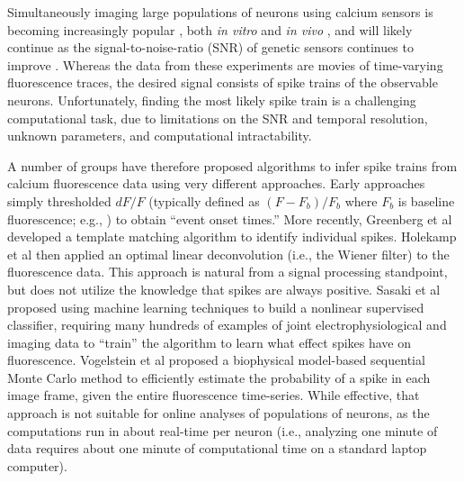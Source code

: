 
Simultaneously imaging large populations of neurons using calcium sensors is becoming increasingly popular \cite{ImagingManual}, both \emph{in vitro} \cite{SmettersYuste99, IkegayaYuste04} and \emph{in vivo} \cite{NagayamaChen07, GobelHelmchen07, LuoSvoboda08}, and will likely continue as the signal-to-noise-ratio (SNR) of genetic sensors continues to improve \cite{GaraschukKonnerth07, MankGriesbeck08b, WallaceHasan08}.  Whereas the data from these experiments are movies of time-varying fluorescence traces, the desired signal consists of spike trains of the observable neurons. Unfortunately, finding the most likely spike train is a challenging computational task, due to limitations on the SNR and temporal resolution, unknown parameters, and computational intractability. %

A number of groups have therefore proposed algorithms to infer spike trains from calcium fluorescence data using very different approaches.  Early approaches simply thresholded $dF/F$ (typically defined as $(F-F_b)/F_b$ where $F_b$ is baseline fluorescence; e.g., \cite{Schwartz98,Mao01}) to obtain ``event onset times.''  More recently, Greenberg et al \cite{GreenbergKerr08} developed a  template matching algorithm to identify individual spikes. %
Holekamp et al \cite{HolekampHoly08} then applied an optimal linear deconvolution (i.e., the Wiener filter) to the fluorescence data.  This approach is natural from a signal processing standpoint, but does not utilize the knowledge that spikes are always positive.  Sasaki et al \cite{SasakiIkegaya08} proposed using machine learning techniques to build a nonlinear supervised classifier, requiring many hundreds of examples of joint electrophysiological and imaging data to ``train'' the algorithm to learn what effect spikes have on fluorescence.  Vogelstein et al \cite{VogelsteinPaninski09} proposed a biophysical model-based sequential Monte Carlo method to efficiently estimate the probability of a spike in each image frame, given the entire fluorescence time-series.  While effective, that approach is not suitable for online analyses of populations of neurons, as the computations run in about real-time per neuron (i.e., analyzing one minute of data requires about one minute of computational time on a standard laptop computer).

